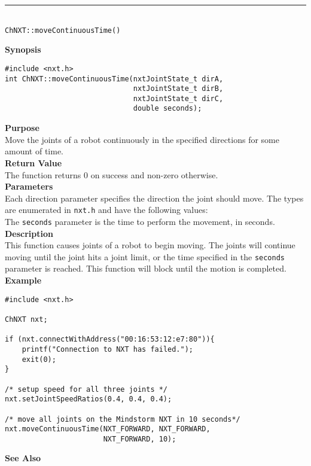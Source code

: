 \noindent
\vspace{5pt}
\rule{4.5in}{0.015in}\\
\noindent
{\LARGE \texttt{ChNXT::moveContinuousTime()} }\\


\noindent
{\bf Synopsis}
\begin{lstlisting}
#include <nxt.h>
int ChNXT::moveContinuousTime(nxtJointState_t dirA, 
                              nxtJointState_t dirB, 
                              nxtJointState_t dirC, 
                              double seconds);
\end{lstlisting}

\noindent
{\bf Purpose}\\
Move the joints of a robot continuously in the specified directions for some amount of time.\\

\noindent
{\bf Return Value}\\
The function returns 0 on success and non-zero otherwise.\\

\noindent
{\bf Parameters}\\
Each direction parameter specifies the direction the joint should 
move. The types are enumerated in \texttt{nxt.h} and have the 
following values:\\  
\noindent
The \texttt{seconds} parameter is the time to perform the movement, in seconds.
\\

\noindent
{\bf Description}\\
This function causes joints of a robot to begin moving. The joints
will continue moving until the joint hits a joint limit, or the 
time specified in the \texttt{seconds} parameter is reached. This 
function will block until the motion is completed.\\

\noindent
{\bf Example}
\begin{lstlisting}
#include <nxt.h> 

ChNXT nxt;

if (nxt.connectWithAddress("00:16:53:12:e7:80")){
    printf("Connection to NXT has failed.");
    exit(0);
}
 
/* setup speed for all three joints */
nxt.setJointSpeedRatios(0.4, 0.4, 0.4);

/* move all joints on the Mindstorm NXT in 10 seconds*/
nxt.moveContinuousTime(NXT_FORWARD, NXT_FORWARD, 
                       NXT_FORWARD, 10);
\end{lstlisting}

\noindent
{\bf See Also}\\
